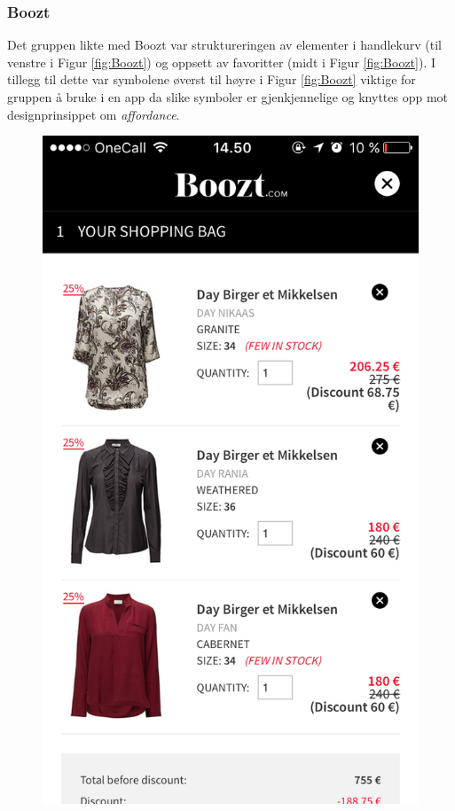 \subsubsection{Boozt}
Det gruppen likte med Boozt var struktureringen av elementer i handlekurv (til venstre i Figur \ref{fig:Boozt}) og oppsett av favoritter (midt i Figur \ref{fig:Boozt}). I tillegg til dette var symbolene øverst til høyre i Figur \ref{fig:Boozt} viktige for gruppen å bruke i en app da slike symboler er gjenkjennelige og knyttes opp mot designprinsippet om \textit{affordance}. 

\begin{figure}[H]
\includegraphics[scale=0.2]{images/inspiration/image1}

\end{figure}
